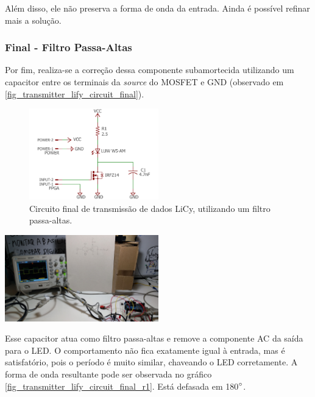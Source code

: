 	Além disso, ele não preserva a forma de onda da entrada. Ainda é possível refinar mais a solução.

	\subsubsection{Final - Filtro Passa-Altas}
	Por fim, realiza-se a correção dessa componente subamortecida utilizando um capacitor entre os terminais da \textit{source} do MOSFET e GND (observado em \autoref{fig_transmitter_lify_circuit_final}).
	\begin{figure}[h!]
		\caption{\label{fig_transmitter_lify_circuit_final}Circuito final de transmissão de dados LiCy, utilizando um filtro passa-altas.}
		\centering
		\includegraphics[width=0.5\textwidth, trim={2cm 0cm 2cm 0cm}, clip]{circuits/transmitter_lify.pdf}
	\end{figure}

	\begin{chart}[h!]
		\caption{\label{fig_transmitter_lify_circuit_final_r1} Forma de onda após adicionar um capacitor que age como filtro passa-altas. Está defasada em 180$\degree$. }
		\centering
		\includegraphics[width=0.5\textwidth, trim={10cm 35cm 97cm 22cm}, clip]{circuits/photos/TX_200k_with_filter.jpeg}
	\end{chart}
	Esse capacitor atua como filtro passa-altas e remove a componente AC da saída para o LED. O comportamento não fica exatamente igual à entrada, mas é satisfatório, pois o período é muito similar, chaveando o LED corretamente. A forma de onda resultante pode ser observada no gráfico \ref{fig_transmitter_lify_circuit_final_r1}. Está defasada em 180$\degree$.

